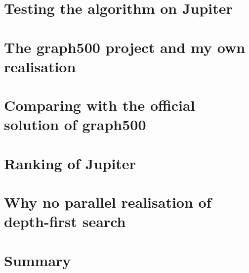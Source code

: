 \documentclass[11pt,a4paper]{article}
\begin{document}
\section{Testing the algorithm on Jupiter}
\label{sec:testing}

\section{The graph500 project and my own realisation}
\label{sec:graph500}

\section{Comparing with the official solution of graph500}
\label{sec:Comparing}

\section{Ranking of Jupiter}
\label{sec:ranking}

\section{Why no parallel realisation of depth-first search}
\label{sec:depth-first search}

\section{Summary}
\label{sec:summary}

\clearpage



\end{document}
